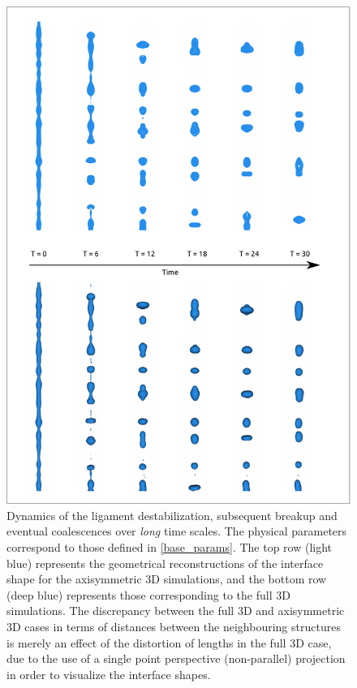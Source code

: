 \begin{figure}
\centering
\includegraphics{plots/ligament_breakup/3d_vs_2d_long_new.pdf}
	\caption{Dynamics of the ligament destabilization, subsequent breakup 
	and eventual coalescences over \textit{long} time scales. 
	The physical parameters correspond to those defined in \eqref{base_params}.
	The top row (light blue) represents the geometrical reconstructions of 
	the interface shape for the axisymmetric 3D simulations, and the bottom 
	row (deep blue) represents those corresponding to the full 3D simulations.
	The discrepancy between the full 3D and axisymmetric 3D cases in terms of distances between
	the neighbouring structures is merely an effect of the distortion of lengths
	in the full 3D case, due to the use of a single point perspective (non-parallel) 
	projection in order to visualize the interface shapes. 
	}
\label{2d_3d_long}
\end{figure}

